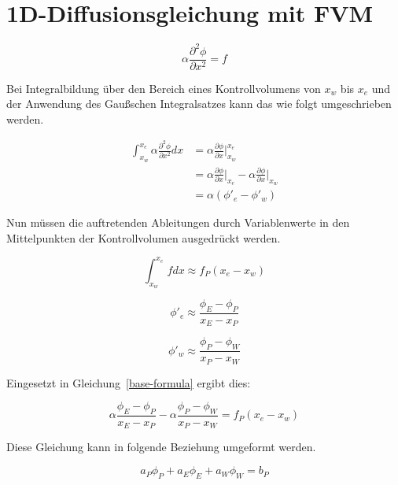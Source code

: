 \documentclass[10pt, ngerman,colorback,accentcolor=tud2d]{tudreport}
\begin{document}
\chapter{1D-Diffusionsgleichung mit FVM}

\begin{equation} \label{base-formula}
\alpha \frac{\partial^2 \phi}{\partial x^2} = f
\end{equation}

Bei Integralbildung über den Bereich eines Kontrollvolumens von $x_w$ bis $x_e$
und der Anwendung des Gaußschen Integralsatzes kann das wie folgt umgeschrieben werden.

\begin{align*}
\int_{x_w}^{x_e}\alpha \frac{\partial^2 \phi}{\partial x^2} dx
&= \alpha \frac{\partial \phi}{\partial x}\Big|_{x_w}^{x_e}\\
&= \alpha \frac{\partial \phi}{\partial x}\Big|_{x_e}
 - \alpha \frac{\partial \phi}{\partial x}\Big|_{x_w}\\
&= \alpha (\phi'_e - \phi'_w)
\end{align*}

Nun müssen die auftretenden Ableitungen durch Variablenwerte in den Mittelpunkten
der Kontrollvolumen ausgedrückt werden.

\begin{equation*}
\int_{x_w}^{x_e}f dx \approx f_P (x_e - x_w)
\end{equation*}

\begin{equation*}
\phi'_e \approx \frac{\phi_E - \phi_P}{x_E - x_P}
\end{equation*}

\begin{equation*}
\phi'_w \approx \frac{\phi_P - \phi_W}{x_P - x_W}
\end{equation*}

Eingesetzt in Gleichung~\ref{base-formula} ergibt dies:

\begin{equation}
\alpha \frac{\phi_E - \phi_P}{x_E - x_P} - \alpha \frac{\phi_P - \phi_W}{x_P - x_W}
= f_P (x_e - x_w)
\end{equation}

Diese Gleichung kann in folgende Beziehung umgeformt werden.

\newcommand{\diffEP}{(x_E-x_P)}
\newcommand{\diffPW}{(x_P-x_W)}
\newcommand{\diffew}{(x_e-x_w)}

\begin{equation}
a_P \phi_P + a_E \phi_E + a_W \phi_W = b_P
\end{equation}
\end{document}
